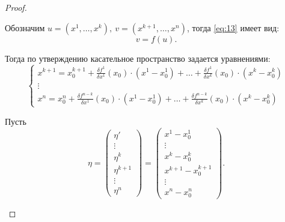 \begin{proof}
\begin{enumerate}
              Обозначим $u = (x^1,\ldots,x^k), \ v = (x^{k+1},\ldots,x^n)$, тогда \ref{eq:13} имеет вид:
              \[
                  v = f(u).
              \]

              Тогда по утверждению касательное пространство задается уравнениями:
              \begin{equation}\label{eq:14}
                  \left\{\begin{array}{l}
                      x^{k+1} = x_0^{k + 1} + \frac{\delta f^1}{\delta x^1}(x_0)\cdot(x^1-x_0^1) + \ldots + \frac{\delta f^1}{\delta x^k}(x_0)\cdot(x^k - x_0^k) \\
                      \vdots                                                                                                                                     \\
                      x^n = x_0^n + \frac{\delta f^{n-k}}{\delta x^1}(x_0)\cdot(x^1 - x_0^1) + \ldots + \frac{\delta f^{n-k}}{\delta x^k}(x_0)\cdot(x^k - x_0^k)
                  \end{array}\right.
              \end{equation}

              Пусть
              \[
                  \eta = \left(\begin{matrix}
                          \eta'      \\
                          \vdots     \\
                          \eta^k     \\
                          \eta^{k+1} \\
                          \vdots     \\
                          \eta^n
                      \end{matrix}\right) = \left(\begin{matrix}
                          x^1 - x_0^1         \\
                          \vdots              \\
                          x^k - x_0^k         \\
                          x^{k+1} - x^{k+1}_0 \\
                          \vdots              \\
                          x^n - x_0^n
                      \end{matrix}\right).
              \]


\end{enumerate}
\end{proof}
